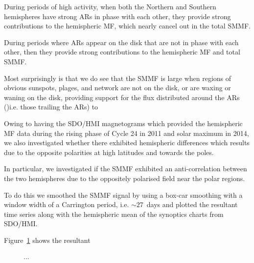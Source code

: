 During periods of high activity, when both the Northern and Southern hemispheres have strong ARs in phase with each other, they provide strong contributions to the hemispheric MF, which nearly cancel out in the total SMMF.

During periods where ARs appear on the disk that are not in phase with each other, then they provide strong contributions to the hemispheric MF and total SMMF.

Most surprisingly is that we do see that the SMMF is large when regions of obvious sunspots, plages, and network are not on the disk, or are waxing or waning on the disk, providing support for the flux distributed around the ARs ()i.e. those trailing the ARs) to 


Owing to having the SDO/HMI magnetograms which provided the hemispheric MF data during the rising phase of Cycle 24 in 2011 and solar maximum in 2014, we also investigated whether there exhibited hemispheric differences which results due to the opposite polarities at high latitudes and towards the poles.

In particular, we investigated if the SMMF exhibited an anti-correlation between the two hemispheres due to the oppositely polarised field near the polar regions.

To do this we smoothed the SMMF signal by using a box-car smoothing with a window width of a Carrington period, i.e. $\sim 27$~days and plotted the resultant time series along with the hemispheric mean of the synoptics charts from SDO/HMI. 

Figure~\ref{fig:HMI_MF_vs_synoptics} shows the resultant 

\begin{figure}[!ht]
	\centering
	\qquad
	\caption{...}
	\label{fig:HMI_MF_vs_synoptics}
\end{figure}




